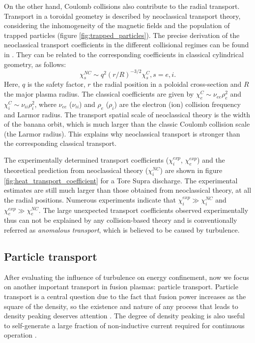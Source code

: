 On the other hand, Coulomb collisions also contribute to the radial transport. Transport in a toroidal geometry is described by neoclassical transport theory, considering the inhomogeneity of the magnetic fields and the population of trapped particles (figure \ref{fig:trapped_particles}). The precise derivation of the neoclassical transport coefficients in the different collisional regimes can be found in \cite{Hinton_1976_RMP}. They can be related to the corresponding coefficients in classical cylindrical geometry, as follows:%
\begin{equation}
  \chi_s^{NC} \sim q^2(r/R)^{-3/2}\chi_s^{C}, s=e,i.
\end{equation}
\noindent Here, $q$ is the safety factor, $r$ the radial position in a poloidal cross-section and $R$ the major plasma radius. The classical coefficients are given by $\chi_e^C \sim \nu_{ee}\rho_e^2$ and $\chi_i^C \sim \nu_{ii}\rho_i^2$, where $\nu_{ee}$ ($\nu_{ii}$) and $\rho_e$ ($\rho_i$) are the electron (ion)  collision frequency and Larmor radius. The transport spatial scale of neoclassical theory is the width of the banana orbit, which is much larger than the classic Coulomb collision scale (the Larmor radius). This explains why neoclassical transport is stronger than the corresponding classical transport.

The experimentally determined transport coefficients ($\chi_i^{exp}$, $\chi_e^{exp}$) and the theoretical prediction from neoclassical theory ($\chi_i^{NC}$) are shown in figure \ref{fig:heat_transport_coefficient} for a Tore Supra discharge. The experimental estimates are still much larger than those obtained from neoclassical theory, at all the radial positions. Numerous experiments indicate that $\chi_i^{exp} \gg \chi_i^{NC}$ and $\chi_e^{exp} \gg \chi_e^{NC}$. The large unexpected transport coefficients observed experimentally thus can not be explained by any collision-based theory and is conventionally referred as \emph{anomalous transport}, which is believed to be caused by turbulence.


\subsection{Particle transport} \label{sec:particle_transport}

After evaluating the influence of turbulence on energy confinement, now we focus on another important transport in fusion plasmas: particle transport. Particle transport is a central question due to the fact that fusion power increases as the square of the density, so the existence and nature of any process that leads to density peaking deserves attention \cite{Garbet_ITGTEM_2004_PPCF_EPS}. The degree of density peaking is also useful to self-generate a large fraction of non-inductive current required for continuous operation \cite{Bourdelle_PPCF_05_review_turbulent_particle_transport}.

